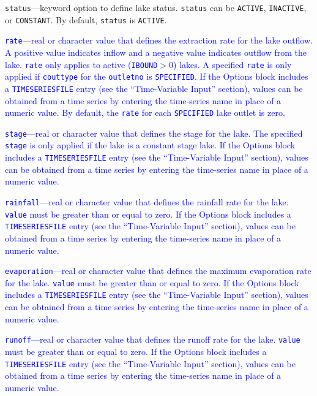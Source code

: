 \item \texttt{status}---keyword option to define lake status.  \texttt{status} can be \texttt{ACTIVE}, \texttt{INACTIVE}, or \texttt{CONSTANT}. By default, \texttt{status} is \texttt{ACTIVE}.

\item \textcolor{blue}{\texttt{rate}---real or character value that defines the extraction rate for the lake outflow. A positive value indicates inflow and a negative value indicates outflow from the lake. \texttt{rate} only applies to active (\texttt{IBOUND}$>0$) lakes. A specified \texttt{rate} is only applied if \texttt{couttype} for the \texttt{outletno} is \texttt{SPECIFIED}. If the Options block includes a \texttt{TIMESERIESFILE} entry (see the ``Time-Variable Input'' section), values can be obtained from a time series by entering the time-series name in place of a numeric value. By default, the \texttt{rate} for each \texttt{SPECIFIED} lake outlet is zero.}

\item \textcolor{blue}{\texttt{stage}---real or character value that defines the stage for the lake. The specified \texttt{stage} is only applied if the lake is a constant stage lake. If the Options block includes a \texttt{TIMESERIESFILE} entry (see the ``Time-Variable Input'' section), values can be obtained from a time series by entering the time-series name in place of a numeric value.}

\item \textcolor{blue}{\texttt{rainfall}---real or character value that defines the rainfall rate for the lake. \texttt{value} must be greater than or equal to zero. If the Options block includes a \texttt{TIMESERIESFILE} entry (see the ``Time-Variable Input'' section), values can be obtained from a time series by entering the time-series name in place of a numeric value.}

\item \textcolor{blue}{\texttt{evaporation}---real or character value that defines the maximum evaporation rate for the lake. \texttt{value} must be greater than or equal to zero. If the Options block includes a \texttt{TIMESERIESFILE} entry (see the ``Time-Variable Input'' section), values can be obtained from a time series by entering the time-series name in place of a numeric value.}

\item \textcolor{blue}{\texttt{runoff}---real or character value that defines the runoff rate for the lake. \texttt{value} must be greater than or equal to zero. If the Options block includes a \texttt{TIMESERIESFILE} entry (see the ``Time-Variable Input'' section), values can be obtained from a time series by entering the time-series name in place of a numeric value.}

